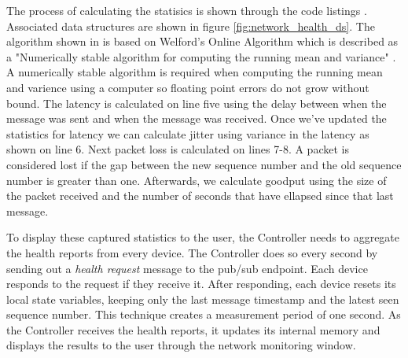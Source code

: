 \documentclass[letterpaper,twocolumn,12pt]{article}
\begin{document}
The process of calculating the statisics is shown through the code listings 
. Associated data structures are shown in figure \ref{fig:network_health_ds}. The algorithm shown in 
is based on Welford's Online Algorithm 
which is described as a "Numerically stable algorithm for computing the running mean and variance" 
. A numerically stable algorithm is required when computing the running mean and varience using a computer so floating point errors do not grow without bound. The latency is calculated on line five using the delay between when the message was sent and when the message was received. Once we've updated the statistics for latency we can calculate jitter using variance in the latency as shown on line 6. Next packet loss is calculated on lines 7-8. A packet is considered lost if the gap between the new sequence number and the old sequence number is greater than one. Afterwards, we calculate goodput using the size of the packet received and the number of seconds that have ellapsed since that last message.  




To display these captured statistics to the user, the Controller needs to aggregate the health reports from every device. The Controller does so every second by sending out a \textit{health request} message to the pub/sub endpoint. Each device responds to the request if they receive it. After responding, each device resets its local state variables, keeping only the last message timestamp and the latest seen sequence number. This technique creates a measurement period of one second. As the Controller receives the health reports, it updates its internal memory and displays the results to the user through the network monitoring window.
\end{document}
